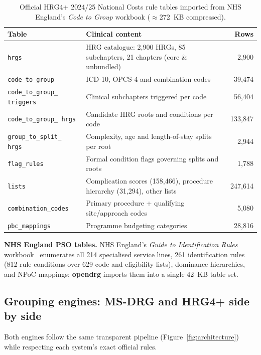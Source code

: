 \documentclass[fleqn,10pt]{IOMEDArticle}
\begin{document}
\begin{table}[!t]\centering
\caption{Official HRG4+ 2024/25 National Costs rule tables imported from NHS England's \emph{Code to Group} workbook ($\approx$272~KB compressed).}
\label{tab:hrgtables}
\scriptsize
\setlength{\tabcolsep}{3.5pt}
\begin{tabular}{@{}p{2.9cm}p{3.9cm}r@{}}
\toprule
Table & Clinical content & Rows \\
\midrule
\texttt{hrgs} & HRG catalogue: 2{,}900 HRGs, 85 subchapters, 21 chapters (core \& unbundled) & 2{,}900 \\
\texttt{code\_to\_group} & ICD-10, OPCS-4 and combination codes & 39{,}474 \\
\texttt{code\_to\_group\_ triggers} & Clinical subchapters triggered per code & 56{,}404 \\
\texttt{code\_to\_group\_ hrgs} & Candidate HRG roots and conditions per code & 133{,}847 \\
\texttt{group\_to\_split\_ hrgs} & Complexity, age and length-of-stay splits per root & 2{,}944 \\
\texttt{flag\_rules} & Formal condition flags governing splits and roots & 1{,}788 \\
\texttt{lists} & Complication scores (158{,}466), procedure hierarchy (31{,}294), other lists & 247{,}614 \\
\texttt{combination\_codes} & Primary procedure + qualifying site/approach codes & 5{,}080 \\
\texttt{pbc\_mappings} & Programme budgeting categories & 28{,}816 \\
\bottomrule
\end{tabular}
\end{table}

\textbf{NHS England PSO tables.} NHS England's \emph{Guide to Identification Rules} workbook~\cite{nhse2026pso} enumerates all 214 specialised service lines, 261 identification rules (812 rule conditions over 629 code and eligibility lists), dominance hierarchies, and NPoC mappings; \textbf{opendrg} imports them into a single 42~KB table set.

\subsection{Grouping engines: MS-DRG and HRG4+ side by side}

Both engines follow the same transparent pipeline (Figure~\ref{fig:architecture}) while respecting each system's exact official rules.
\end{document}
